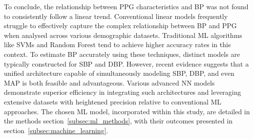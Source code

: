 To conclude, the relationship between PPG characteristics and BP was not found to consistently follow a linear trend.
Conventional linear models frequently struggle to effectively capture the complex relationship between BP and PPG when analysed across various demographic datasets.
Traditional ML algorithms like SVMs and Random Forest tend to achieve higher accuracy rates in this context.
To estimate BP accurately using these techniques, distinct models are typically constructed for SBP and DBP\@.
However, recent evidence suggests that a unified architecture capable of simultaneously modeling SBP, DBP, and even MAP is both feasible and advantageous.
Various advanced NN models demonstrate superior efficiency in integrating such architectures and leveraging extensive datasets with heightened precision relative to conventional ML approaches.
The chosen ML model, incorporated within this study, are detailed in the methods section~\ref{subsec:ml_methods}, with their outcomes presented in section~\ref{subsec:machine_learning}.